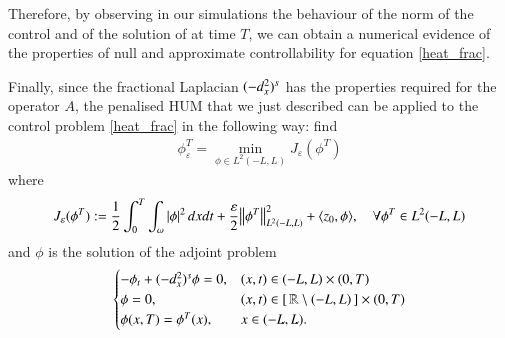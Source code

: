 Therefore, by observing in our simulations the behaviour of the norm of the control and of the solution of at time $T$, we can obtain a numerical evidence of the properties of null and approximate controllability for equation \eqref{heat_frac}. 

Finally, since the fractional Laplacian $(-d_x^2)^{s}$ has the properties required for the operator $A$, the penalised HUM that we just described can be applied to the control problem \eqref{heat_frac} in the following way: find
\begin{align*}
	\phi^T_\varepsilon=\min_{\phi\in L^2(-L,L)} J_\varepsilon (\phi^T)
\end{align*}
where 
\begin{align*}
	J_\varepsilon(\phi^T):=\frac{1}{2}\int_0^T\int_{\omega}|\phi|^2\,dxdt+\frac{\varepsilon}{2}{\left\|\phi^T\right\|}_{L^2(-L,L)}^2 + \langle z_0,\phi\rangle, \quad \forall \phi^T\in L^2(-L,L) 
\end{align*}
and $\phi$ is the solution of the adjoint problem
\begin{align*}
	\begin{cases}
		-\phi_t + (-d_x^2)^{s}\phi = 0, & (x,t)\in (-L,L)\times(0,T)
		\\
		\phi = 0, & (x,t)\in [\,\mathbb{R}\setminus(-L,L)\,]\times(0,T)
		\\
		\phi(x,T) = \phi^T(x), & x\in (-L,L).
	\end{cases}
\end{align*}
